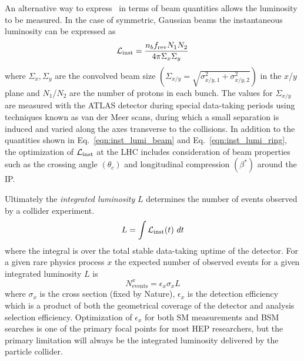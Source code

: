 An alternative way to express \InstLumi\ in terms of beam quantities allows the luminosity to be measured\cite{Grafstrom:2015foa}. In the case of symmetric, Gaussian beams the instantaneous luminosity can be expressed as
\begin{equation}
\mathcal{L}_{\mathrm{inst}} = \frac{n_b f_{\mathrm{rev}} N_1 N_2}{4\pi \Sigma_x \Sigma_y}
\label{eqn:inst_lumi_beam}
\end{equation}
where $\Sigma_x, \Sigma_y$ are the convolved beam size $\left(\Sigma_{x/y} = \sqrt{\sigma_{x/y,1}^2 + \sigma_{x/y,2}^2}\right)$ in the $x$/$y$ plane and $N_1$/$N_2$ are the number of protons in each bunch.
The values for $\Sigma_{x/y}$ are measured with the ATLAS detector during special data-taking periods \cite{ATLAS-CONF-2019-021} using techniques known as van der Meer scans, during which a small separation is induced and varied along the axes transverse to the collisions. In addition to the quantities shown in Eq.~\ref{eqn:inst_lumi_beam} and Eq.~\ref{eqn:inst_lumi_ring}, the optimization of $\mathcal{L}_{\mathrm{inst}}$ at the LHC includes consideration of beam properties such as the crossing angle $(\theta_c)$ and longitudinal compression $(\beta^*)$ around the IP.

Ultimately the \textit{integrated luminosity} $L$ determines the number of events observed by a collider experiment.
\begin{equation}
L = \int \mathcal{L}_{\mathrm{inst}}(t)\ dt
\label{eqn:integrated_lumi}
\end{equation}
where the integral is over the total stable data-taking uptime of the detector.
For a given rare physics process $x$ the expected number of observed events for a given integrated luminosity $L$ is
\begin{equation}
N_{\mathrm{events}}^{x} = \epsilon_x \sigma_x L
\label{eqn:nobs_events}
\end{equation}
where $\sigma_x$ is the cross section (fixed by Nature), $\epsilon_x$ is the detection efficiency which is a product of both the geometrical coverage of the detector and analysis selection efficiency.
Optimization of $\epsilon_x$ for both SM measurements and BSM searches is one of the primary focal points for most HEP researchers, but the primary limitation will always be the integrated luminosity delivered by the particle collider.

